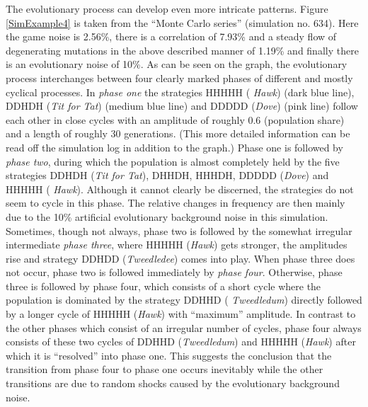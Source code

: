 The evolutionary process can develop even more intricate patterns.  Figure
\ref{SimExample4} is taken from the ``Monte Carlo series'' (simulation no.
634). Here the game noise is
2.56\%, there is a correlation of 7.93\% and a steady flow of degenerating
mutations in the above described manner of 1.19\% and finally there is an
evolutionary noise of 10\%. As can be seen on the graph, the evolutionary
process interchanges between four clearly marked phases of different and
mostly cyclical processes. In {\em phase one} the strategies HHHHH ({\em
  Hawk}) (dark blue line), DDHDH ({\em Tit for Tat}) (medium blue line) and
DDDDD ({\em Dove}) (pink line) follow each other in close cycles with an
amplitude of roughly 0.6 (population share) and a length of roughly 30
generations. (This more detailed information can be read off the simulation
log in addition to the graph.) Phase one is followed by {\em phase two},
during which the population is almost completely held by the five strategies
DDHDH ({\em Tit for Tat}), DHHDH, HHHDH, DDDDD ({\em Dove}) and HHHHH ({\em
  Hawk}). Although it cannot clearly be discerned, the strategies do not seem
to cycle in this phase. The relative changes in frequency are then mainly due
to the 10\% artificial evolutionary background noise in this simulation.
Sometimes, though not always, phase two is followed by the somewhat irregular
intermediate {\em phase three}, where HHHHH ({\em Hawk}) gets stronger, the
amplitudes rise and strategy DDHDD ({\em Tweedledee}) comes into play. When
phase three does not occur, phase two is followed immediately by {\em phase
  four}. Otherwise, phase three is followed by phase four, which consists of a
short cycle where the population is dominated by the strategy DDHHD ({\em
  Tweedledum}) directly followed by a longer cycle of HHHHH ({\em Hawk}) with
``maximum'' amplitude.  In contrast to the other phases which consist of an
irregular number of cycles, phase four always consists of these two cycles of
DDHHD ({\em Tweedledum}) and HHHHH ({\em Hawk}) after which it is ``resolved''
into phase one. This suggests the conclusion that the transition from phase
four to phase one occurs inevitably while the other transitions are due to
random shocks caused by the evolutionary background noise.

